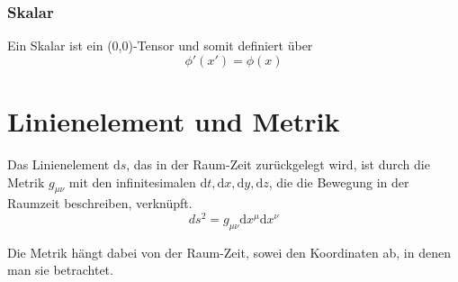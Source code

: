 \documentclass{article}
\newcommand{\diff}{\mathrm{d}}
\begin{document}
\subsubsection{Skalar}
Ein Skalar ist ein (0,0)-Tensor und somit definiert über
	\begin{equation}
		\phi'(x') = \phi(x)
	\end{equation}


\newpage


\section{Linienelement und Metrik}
Das Linienelement $\diff s$, das in der Raum-Zeit zurückgelegt wird, ist durch die Metrik $g_{\mu\nu}$ mit den infinitesimalen $\diff t, \diff x, \diff y, \diff z$, die die Bewegung in der Raumzeit beschreiben, verknüpft.
	\begin{equation}
		ds^2 = g_{\mu\nu} \diff x^\mu \diff x^\nu
	\end{equation}

Die Metrik hängt dabei von der Raum-Zeit, sowei den Koordinaten ab, in denen man sie betrachtet.
\end{document}
